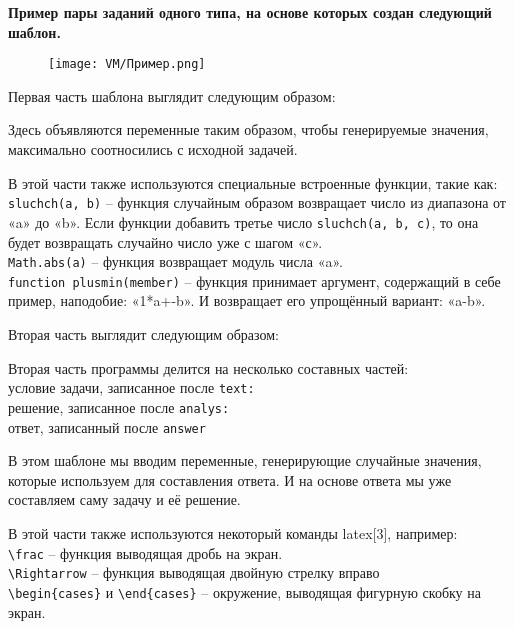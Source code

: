 \textbf{Пример пары заданий одного типа, на основе которых создан следующий шаблон. } 

\begin{figure}[h]
		\centering
		\texttt{[image: VM/Пример.png]}
\label{ris:image}
\end{figure}

Первая часть шаблона выглядит следующим образом:



Здесь объявляются переменные таким образом, чтобы генерируемые значения,  максимально соотносились с исходной задачей.

В этой части также используются специальные встроенные функции, такие как:
\\ \texttt{sluchch(a, b)} – функция случайным образом возвращает число из диапазона от «a» до «b». Если функции добавить третье число \texttt{sluchch(a, b, с)}, то она будет возвращать случайно число уже с шагом «с».
\\ \texttt{Math.abs(a)} – функция возвращает модуль числа «a».
\\ \texttt{function plusmin(member)} – функция принимает аргумент, содержащий в себе пример, наподобие: «1*a+-b». И возвращает его упрощённый вариант: «a-b».

Вторая часть выглядит следующим образом:



Вторая часть программы делится на несколько составных частей:
\\ условие задачи, записанное после \texttt{text:}
\\ решение, записанное после \texttt{analys:}
\\ ответ, записанный после \texttt{answer}

В этом шаблоне мы вводим переменные, генерирующие случайные значения, которые используем для составления ответа. И на основе ответа мы уже составляем саму задачу и её решение.

В этой части также используются некоторый команды latex[3], например:
\\ \texttt{\textbackslash frac} – функция выводящая дробь на экран.
\\ \texttt{\textbackslash Rightarrow} – функция выводящая двойную стрелку вправо
\\ \texttt{\textbackslash begin\{cases\}} и \texttt{\textbackslash end\{cases\}} – окружение, выводящая фигурную скобку на экран.

